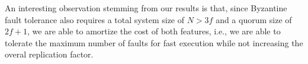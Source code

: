 An interesting observation stemming from our results is that, since Byzantine fault tolerance also requires a total system size of $N>3f$ and a quorum size of $2f+1$, we are able to amortize the cost of both features, i.e., we are able to tolerate the maximum number of faults for fast execution while not increasing the overal replication factor.



